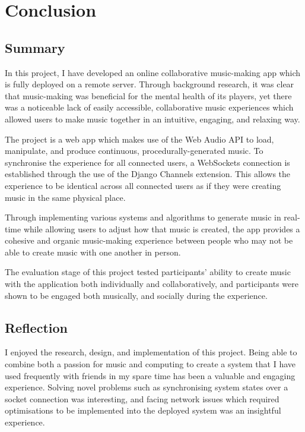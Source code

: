 \chapter{Conclusion}    

\section{Summary}
In this project, I have developed an online collaborative music-making app which is fully deployed on a remote server. Through background research, it was clear that music-making was beneficial for the mental health of its players, yet there was a noticeable lack of easily accessible, collaborative music experiences which allowed users to make music together in an intuitive, engaging, and relaxing way.

The project is a web app which makes use of the Web Audio API to load, manipulate, and produce continuous, procedurally-generated music. To synchronise the experience for all connected users, a WebSockets connection is established through the use of the Django Channels extension. This allows the experience to be identical across all connected users as if they were creating music in the same physical place.

Through implementing various systems and algorithms to generate music in real-time while allowing users to adjust how that music is created, the app provides a cohesive and organic music-making experience between people who may not be able to create music with one another in person.

The evaluation stage of this project tested participants’ ability to create music with the application both individually and collaboratively, and participants were shown to be engaged both musically, and socially during the experience.


\section{Reflection}
I enjoyed the research, design, and implementation of this project. Being able to combine both a passion for music and computing to create a system that I have used frequently with friends in my spare time has been a valuable and engaging experience. Solving novel problems such as synchronising system states over a socket connection was interesting, and facing network issues which required optimisations to be implemented into the deployed system was an insightful experience.

